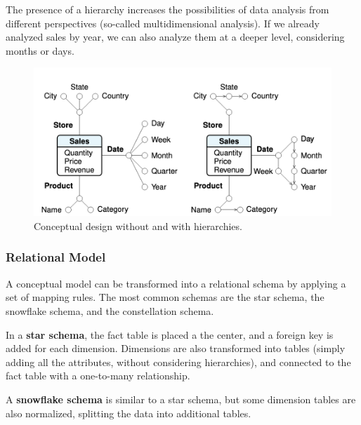 The presence of a hierarchy increases the possibilities of data analysis from different perspectives (so-called multidimensional analysis). If we already analyzed sales by year, we can also analyze them at a deeper level, considering months or days.
\begin{figure}[h]
    \centering
    \includegraphics[width=0.75\linewidth]{img/hierarchies.png}
    \caption{Conceptual design without and with hierarchies.}
    \label{fig:hierarchies}
\end{figure}

\subsubsection{Relational Model}

A conceptual model can be transformed into a relational schema by applying a set of mapping rules. The most common schemas are the star schema, the snowflake schema, and the constellation schema.

In a \textbf{star schema}, the fact table is placed a the center, and a foreign key is added for each dimension. Dimensions are also transformed into tables (simply adding all the attributes, without considering hierarchies), and connected to the fact table with a one-to-many relationship.

A \textbf{snowflake schema} is similar to a star schema, but some dimension tables are also normalized, splitting the data into additional tables.

